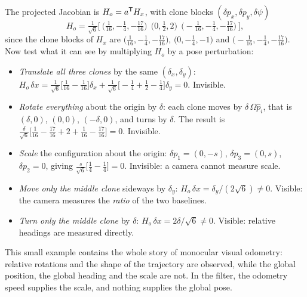 \begin{worked}
The projected Jacobian is $H_o = a^{\mathsf{T}} H_x$, with clone blocks $(\delta p_x, \delta p_y, \delta\psi)$
\begin{equation*}
  H_o = \tfrac{1}{\sqrt6}\Big[\ \big(\tfrac{1}{16}, -\tfrac14, -\tfrac{17}{16}\big)\ \ \big(0, \tfrac12, 2\big)\ \ \big(-\tfrac{1}{16}, -\tfrac14, -\tfrac{17}{16}\big)\ \Big],
\end{equation*}
since the clone blocks of $H_x$ are $\big(\tfrac{1}{16}, -\tfrac14, -\tfrac{17}{16}\big)$, $\big(0, -\tfrac14, -1\big)$ and $\big(-\tfrac{1}{16}, -\tfrac14, -\tfrac{17}{16}\big)$.
Now test what it can see by multiplying $H_o$ by a pose perturbation:
\begin{itemize}
  \item \emph{Translate all three clones} by the same $(\delta_x, \delta_y)$: $H_o\,\delta x = \tfrac{1}{\sqrt6}\big[\tfrac{1}{16} - \tfrac{1}{16}\big]\delta_x + \tfrac{1}{\sqrt6}\big[-\tfrac14 + \tfrac12 - \tfrac14\big]\delta_y = 0$. Invisible.
  \item \emph{Rotate everything} about the origin by $\delta$: each clone moves by $\delta\,\Omega\hat p_i$, that is $(\delta, 0)$, $(0, 0)$, $(-\delta, 0)$, and turns by $\delta$.
        The result is $\tfrac{\delta}{\sqrt6}\big[\tfrac{1}{16} - \tfrac{17}{16} + 2 + \tfrac{1}{16} - \tfrac{17}{16}\big] = 0$. Invisible.
  \item \emph{Scale} the configuration about the origin: $\delta p_1 = (0, -s)$, $\delta p_3 = (0, s)$, $\delta p_2 = 0$, giving $\tfrac{s}{\sqrt6}\big[\tfrac14 - \tfrac14\big] = 0$. Invisible:
        a camera cannot measure scale.
  \item \emph{Move only the middle clone} sideways by $\delta_y$: $H_o\,\delta x = \delta_y/(2\sqrt6) \ne 0$. Visible: the camera measures the \emph{ratio} of the two baselines.
  \item \emph{Turn only the middle clone} by $\delta$: $H_o\,\delta x = 2\delta/\sqrt6 \ne 0$. Visible: relative headings are measured directly.
\end{itemize}
This small example contains the whole story of monocular visual odometry: relative rotations and the shape of the trajectory are observed, while
the global position, the global heading and the scale are not. In the filter, the odometry speed supplies the scale, and nothing supplies the
global pose.
\end{worked}

